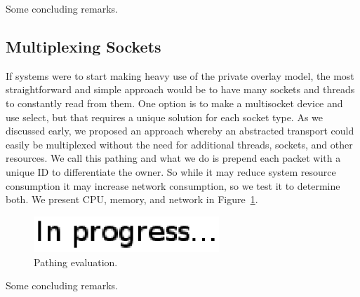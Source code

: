 \documentclass[conference]{IEEEtran}
\begin{document}
Some concluding remarks.

\subsection{Multiplexing Sockets}
\label{pathing_evaluation}
If systems were to start making heavy use of the private overlay model, the most
straightforward and simple approach would be to have many sockets and threads to
constantly read from them.  One option is to make a multisocket device and use
select, but that requires a unique solution for each socket type.  As we
discussed early, we proposed an approach whereby an abstracted transport could
easily be multiplexed without the need for additional threads, sockets, and other
resources.  We call this pathing and what we do is prepend each packet with a
unique ID to differentiate the owner.  So while it may reduce system resource
consumption it may increase network consumption, so we test it to determine both.
We present CPU, memory, and network in Figure~\ref{fig:pathing_eval}.

\begin{figure}[h]
\centering
\includegraphics[width=2.75in]{in_progress.eps}
\caption{Pathing evaluation.}
\label{fig:pathing_eval}
\end{figure}

Some concluding remarks.
\end{document}

